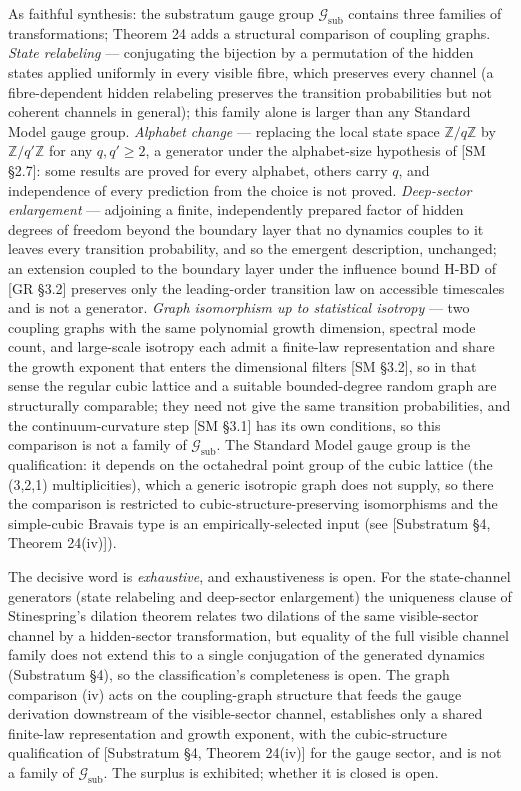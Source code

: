 \documentclass[
]{article}
\begin{document}
As faithful synthesis: the substratum gauge group
\(\mathcal{G}_{\text{sub}}\) contains three families of transformations;
Theorem 24 adds a structural comparison of coupling graphs. \emph{State
relabeling} --- conjugating the bijection by a permutation of the hidden
states applied uniformly in every visible fibre, which preserves every
channel (a fibre-dependent hidden relabeling preserves the transition
probabilities but not coherent channels in general); this family alone
is larger than any Standard Model gauge group. \emph{Alphabet change}
--- replacing the local state space \(\mathbb{Z}/q\mathbb{Z}\) by
\(\mathbb{Z}/q'\mathbb{Z}\) for any \(q,q'\ge 2\), a generator under the
alphabet-size hypothesis of {[}SM §2.7{]}: some results are proved for
every alphabet, others carry \(q\), and independence of every prediction
from the choice is not proved. \emph{Deep-sector enlargement} ---
adjoining a finite, independently prepared factor of hidden degrees of
freedom beyond the boundary layer that no dynamics couples to it leaves
every transition probability, and so the emergent description,
unchanged; an extension coupled to the boundary layer under the
influence bound H-BD of {[}GR §3.2{]} preserves only the leading-order
transition law on accessible timescales and is not a generator.
\emph{Graph isomorphism up to statistical isotropy} --- two coupling
graphs with the same polynomial growth dimension, spectral mode count,
and large-scale isotropy each admit a finite-law representation and
share the growth exponent that enters the dimensional filters {[}SM
§3.2{]}, so in that sense the regular cubic lattice and a suitable
bounded-degree random graph are structurally comparable; they need not
give the same transition probabilities, and the continuum-curvature step
{[}SM §3.1{]} has its own conditions, so this comparison is not a family
of \(\mathcal{G}_{\text{sub}}\). The Standard Model gauge group is the
qualification: it depends on the octahedral point group of the cubic
lattice (the (3,2,1) multiplicities), which a generic isotropic graph
does not supply, so there the comparison is restricted to
cubic-structure-preserving isomorphisms and the simple-cubic Bravais
type is an empirically-selected input (see {[}Substratum §4, Theorem
24(iv){]}).

The decisive word is \emph{exhaustive}, and exhaustiveness is open. For
the state-channel generators (state relabeling and deep-sector
enlargement) the uniqueness clause of Stinespring's dilation theorem
relates two dilations of the same visible-sector channel by a
hidden-sector transformation, but equality of the full visible channel
family does not extend this to a single conjugation of the generated
dynamics (Substratum §4), so the classification's completeness is open.
The graph comparison (iv) acts on the coupling-graph structure that
feeds the gauge derivation downstream of the visible-sector channel,
establishes only a shared finite-law representation and growth exponent,
with the cubic-structure qualification of {[}Substratum §4, Theorem
24(iv){]} for the gauge sector, and is not a family of
\(\mathcal{G}_{\text{sub}}\). The surplus is exhibited; whether it is
closed is open.
\end{document}
